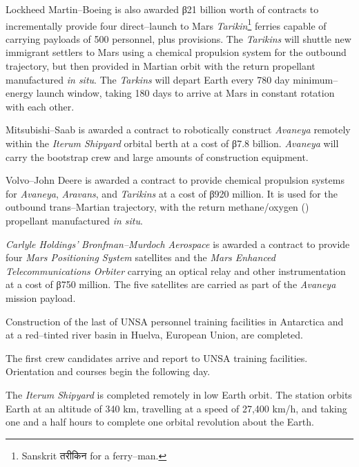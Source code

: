 Lockheed Martin--Boeing is also awarded β21 billion worth of contracts to incrementally provide four direct--launch to Mars {\it Tarikin}\footnote{Sanskrit तरीकिन for a ferry--man.} ferries capable of carrying payloads of 500 personnel, plus provisions. The {\it Tarikins} will shuttle new immigrant settlers to Mars using a chemical  propulsion system for the outbound trajectory, but then provided in Martian orbit with the return  propellant manufactured {\it in situ}. The {\it Tarkins} will depart Earth every 780 day minimum--energy launch window, taking 180 days to arrive at Mars in constant rotation with each other.

Mitsubishi--Saab is awarded a contract to robotically construct {\it Avaneya} remotely within the {\it Iterum Shipyard} orbital berth at a cost of β7.8 billion. {\it Avaneya} will carry the bootstrap crew and large amounts of construction equipment.

Volvo--John Deere is awarded a contract to provide chemical propulsion systems for {\it Avaneya}, {\it Aravans}, and {\it Tarikins} at a cost of β920 million. It is used for the outbound trans--Martian trajectory, with the return methane/oxygen () propellant manufactured {\it in situ}.

{\it Carlyle Holdings'} {\it Bronfman--Murdoch Aerospace} is awarded a contract to provide four {\it Mars Positioning System} satellites and the {\it Mars Enhanced Telecommunications Orbiter} carrying an optical relay and other instrumentation at a cost of β750 million. The five satellites are carried as part of the {\it Avaneya} mission payload.
\StopTimelineDate

Construction of the last of UNSA personnel training facilities in Antarctica and at a red--tinted river basin in Huelva, European Union, are completed.
\StopTimelineDate

The first crew candidates arrive and report to UNSA training facilities. Orientation and courses begin the following day.
\StopTimelineDate

The {\it Iterum Shipyard} is completed remotely in low Earth orbit. The station orbits Earth at an altitude of 340 km, travelling at a speed of 27,400 km/h, and taking one and a half hours to complete one orbital revolution about the Earth.
\StopTimelineDate


